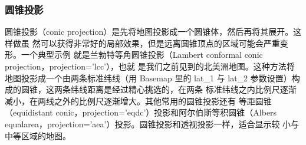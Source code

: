 \subsubsection*{圆锥投影}
圆锥投影（conic projection）是先将地图投影成一个圆锥体，然后再将其展开。这样做虽
然可以获得非常好的局部效果，但是远离圆锥顶点的区域可能会严重变形。一个典型示例
就是兰勃特等角圆锥投影（Lambert conformal conic projection，projection='lcc'），也就
是我们之前见到的北美洲地图。这种方法将地图投影成一个由两条标准纬线（用 Basemap
里的 lat\_1 与 lat\_2 参数设置）构成的圆锥，这两条纬线距离是经过精心挑选的，在两条
标准纬线之内比例尺逐渐减小，在两线之外的比例尺逐渐增大。其他常用的圆锥投影还有
等距圆锥（equidistant conic，projection='eqdc'）投影和阿尔伯斯等积圆锥（Albers equalarea，projection='aea'）投影。圆锥投影和透视投影一样，适合显示较
小与中等区域的地图。